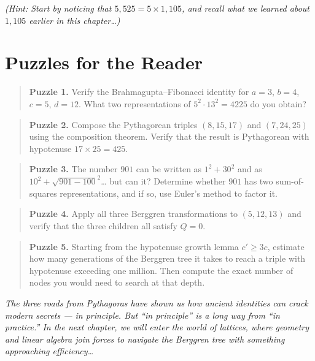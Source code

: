 \emph{(Hint: Start by noticing that \(5{,}525 = 5 \times 1{,}105\), and recall what we learned about \(1{,}105\) earlier in this chapter\ldots)}



\section{Puzzles for the Reader}\label{ch4-puzzles-for-the-reader}

\begin{quote}
\textbf{Puzzle 1.} Verify the Brahmagupta--Fibonacci identity for \(a = 3\), \(b = 4\), \(c = 5\), \(d = 12\). What two representations of \(5^2 \cdot 13^2 = 4225\) do you obtain?
\end{quote}

\begin{quote}
\textbf{Puzzle 2.} Compose the Pythagorean triples \((8, 15, 17)\) and \((7, 24, 25)\) using the composition theorem. Verify that the result is Pythagorean with hypotenuse \(17 \times 25 = 425\).
\end{quote}

\begin{quote}
\textbf{Puzzle 3.} The number \(901\) can be written as \(1^2 + 30^2\) and as \(10^2 + \sqrt{901 - 100}^2\)\ldots{} but can it? Determine whether \(901\) has two sum-of-squares representations, and if so, use Euler's method to factor it.
\end{quote}

\begin{quote}
\textbf{Puzzle 4.} Apply all three Berggren transformations to \((5, 12, 13)\) and verify that the three children all satisfy \(Q = 0\).
\end{quote}

\begin{quote}
\textbf{Puzzle 5.} Starting from the hypotenuse growth lemma \(c' \geq 3c\), estimate how many generations of the Berggren tree it takes to reach a triple with hypotenuse exceeding one million. Then compute the exact number of nodes you would need to search at that depth.
\end{quote}



\emph{The three roads from Pythagoras have shown us how ancient identities can crack modern secrets --- in principle. But ``in principle'' is a long way from ``in practice.'' In the next chapter, we will enter the world of lattices, where geometry and linear algebra join forces to navigate the Berggren tree with something approaching efficiency\ldots{}}
